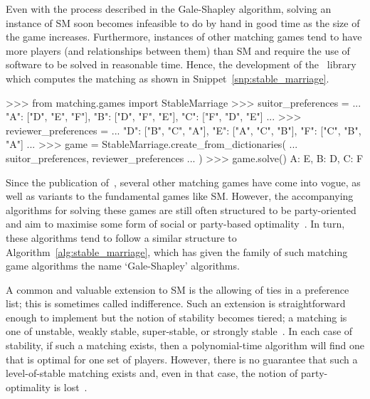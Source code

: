 Even with the process described in the Gale-Shapley algorithm, solving an
instance of SM soon becomes infeasible to do by hand in good time as the size of
the game increases. Furthermore, instances of other matching games tend to have
more players (and relationships between them) than SM and require the use of
software to be solved in reasonable time. Hence, the development of the
\matching\ library which computes the matching as shown in
Snippet~\ref{snp:stable_marriage}.

\begin{listing}[htbp]
\begin{usagepy}
>>> from matching.games import StableMarriage
>>> suitor_preferences = {
...     "A": ["D", "E", "F"], "B": ["D", "F", "E"], "C": ["F", "D", "E"]
... }
>>> reviewer_preferences = {
...     "D": ["B", "C", "A"], "E": ["A", "C", "B"], "F": ["C", "B", "A"]
... }
>>> game = StableMarriage.create_from_dictionaries(
...     suitor_preferences, reviewer_preferences
... )
>>> game.solve()
{A: E, B: D, C: F}

\end{usagepy}
\caption{%
    Solving the game from Figure~\ref{fig:sm_matching} in \matching
}\label{snp:stable_marriage}
\end{listing}

Since the publication of~\cite{Gale1962}, several other matching games have come
into vogue, as well as variants to the fundamental games like SM. However, the
accompanying algorithms for solving these games are still often structured to be
party-oriented and aim to maximise some form of social or party-based
optimality~\cite{Fuku2006,Gale1962,Kwanashie2015}. In turn, these algorithms
tend to follow a similar structure to Algorithm~\ref{alg:stable_marriage}, which
has given the family of such matching game algorithms the name `Gale-Shapley'
algorithms.

A common and valuable extension to SM is the allowing of ties in a preference
list; this is sometimes called indifference. Such an extension is
straightforward enough to implement but the notion of stability becomes tiered;
a matching is one of unstable, weakly stable, super-stable, or strongly
stable~\cite{Irving1994,Iwama2016,Iwama1999}. In each case of stability, if such
a matching exists, then a polynomial-time algorithm will find one that is
optimal for one set of players. However, there is no guarantee that such a
level-of-stable matching exists and, even in that case, the notion of
party-optimality is lost~\cite{Erdil2017}.

